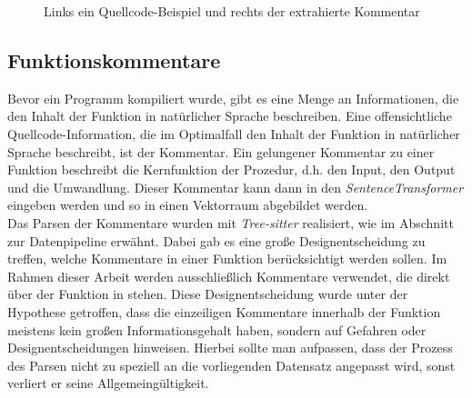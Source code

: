 \documentclass[12pt,letterpaper,ngerman]{article}
\begin{document}
\begin{figure}
  \begin{center}
    \begin{minipage}[c]{6cm}
        \centering
        \inputminted[fontsize=\scriptsize]{c}{comments.c}
    \end{minipage}
    \hspace{0.1cm}
    \begin{minipage}[c]{6cm}
        \centering
        \inputminted[fontsize=\scriptsize]{json}{comments.json}
    \end{minipage}
  \end{center}
  \caption{Links ein Quellcode-Beispiel und rechts der extrahierte Kommentar}
\end{figure}

\subsection{Funktionskommentare}
Bevor ein Programm kompiliert wurde, gibt es eine Menge an
Informationen, die den Inhalt der Funktion in natürlicher Sprache 
beschreiben. Eine offensichtliche Quellcode-Information, die im
Optimalfall den Inhalt der Funktion in natürlicher Sprache 
beschreibt, ist der Kommentar. Ein gelungener Kommentar zu einer
Funktion beschreibt die Kernfunktion der Prozedur, d.h. den Input,
den Output und die Umwandlung. Dieser Kommentar kann dann in den 
\textit{SentenceTransformer} eingeben werden und so in einen
Vektorraum abgebildet werden.\\
Das Parsen der Kommentare wurden mit \textit{Tree-sitter} realisiert,
wie im Abschnitt zur Datenpipeline erwähnt. Dabei gab es eine große
Designentscheidung zu treffen, welche Kommentare in einer Funktion
berücksichtigt werden sollen.
Im Rahmen dieser Arbeit werden ausschließlich Kommentare verwendet,
die direkt  über der Funktion in stehen. Diese Designentscheidung
wurde unter der Hypothese getroffen, dass die einzeiligen
Kommentare innerhalb der Funktion meistens kein großen
Informationsgehalt haben, sondern auf
Gefahren oder Designentscheidungen hinweisen.
Hierbei sollte man aufpassen, dass der Prozess des Parsen nicht zu
speziell an die vorliegenden Datensatz angepasst wird, sonst 
verliert er seine Allgemeingültigkeit. 
\end{document}
